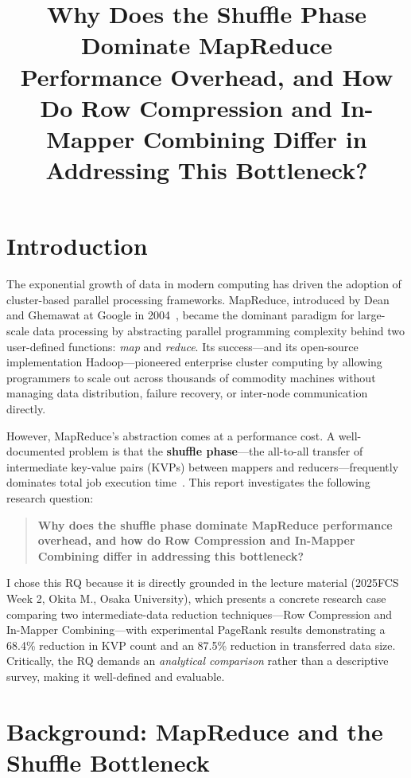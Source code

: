 \documentclass[a4paper,11pt]{article}
\title{\vspace{-1.5cm}Why Does the Shuffle Phase Dominate MapReduce Performance Overhead, and How Do Row Compression and In-Mapper Combining Differ in Addressing This Bottleneck?}
\author{}
\date{}
\begin{document}
\maketitle
\thispagestyle{empty}

\section{Introduction}

The exponential growth of data in modern computing has driven the adoption of cluster-based parallel processing frameworks. MapReduce, introduced by Dean and Ghemawat at Google in 2004~\cite{dean2004}, became the dominant paradigm for large-scale data processing by abstracting parallel programming complexity behind two user-defined functions: \textit{map} and \textit{reduce}. Its success---and its open-source implementation Hadoop---pioneered enterprise cluster computing by allowing programmers to scale out across thousands of commodity machines without managing data distribution, failure recovery, or inter-node communication directly.

However, MapReduce's abstraction comes at a performance cost. A well-documented problem is that the \textbf{shuffle phase}---the all-to-all transfer of intermediate key-value pairs (KVPs) between mappers and reducers---frequently dominates total job execution time~\cite{lin2010}. This report investigates the following research question:

\begin{quote}
\textbf{Why does the shuffle phase dominate MapReduce performance overhead, and how do Row Compression and In-Mapper Combining differ in addressing this bottleneck?}
\end{quote}

I chose this RQ because it is directly grounded in the lecture material (2025FCS Week 2, Okita M., Osaka University), which presents a concrete research case comparing two intermediate-data reduction techniques---Row Compression and In-Mapper Combining---with experimental PageRank results demonstrating a 68.4\% reduction in KVP count and an 87.5\% reduction in transferred data size. Critically, the RQ demands an \textit{analytical comparison} rather than a descriptive survey, making it well-defined and evaluable.

\section{Background: MapReduce and the Shuffle Bottleneck}
\end{document}
